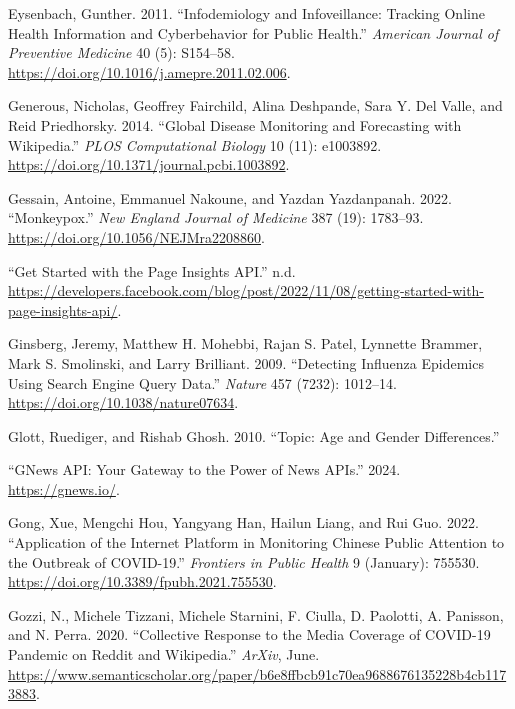 \documentclass[
  12pt,
]{article}
\newlength{\cslhangindent}
\newenvironment{CSLReferences}[2] %
 {\begin{list}{}{%
  \setlength{\itemindent}{0pt}
  \setlength{\leftmargin}{0pt}
  \setlength{\parsep}{0pt}
  \ifodd #1
   \setlength{\leftmargin}{\cslhangindent}
   \setlength{\itemindent}{-1\cslhangindent}
  \fi
  \setlength{\itemsep}{#2\baselineskip}}}
 {\end{list}}
\begin{document}
\begin{CSLReferences}{1}{0}
Eysenbach, Gunther. 2011. {``Infodemiology and Infoveillance: Tracking
Online Health Information and Cyberbehavior for Public Health.''}
\emph{American Journal of Preventive Medicine} 40 (5): S154--58.
\url{https://doi.org/10.1016/j.amepre.2011.02.006}.

Generous, Nicholas, Geoffrey Fairchild, Alina Deshpande, Sara Y. Del
Valle, and Reid Priedhorsky. 2014. {``Global Disease Monitoring and
Forecasting with Wikipedia.''} \emph{PLOS Computational Biology} 10
(11): e1003892. \url{https://doi.org/10.1371/journal.pcbi.1003892}.

Gessain, Antoine, Emmanuel Nakoune, and Yazdan Yazdanpanah. 2022.
{``Monkeypox.''} \emph{New England Journal of Medicine} 387 (19):
1783--93. \url{https://doi.org/10.1056/NEJMra2208860}.

{``Get Started with the Page Insights API.''} n.d.
\url{https://developers.facebook.com/blog/post/2022/11/08/getting-started-with-page-insights-api/}.

Ginsberg, Jeremy, Matthew H. Mohebbi, Rajan S. Patel, Lynnette Brammer,
Mark S. Smolinski, and Larry Brilliant. 2009. {``Detecting Influenza
Epidemics Using Search Engine Query Data.''} \emph{Nature} 457 (7232):
1012--14. \url{https://doi.org/10.1038/nature07634}.

Glott, Ruediger, and Rishab Ghosh. 2010. {``Topic: Age and Gender
Differences.''}

{``GNews API: Your Gateway to the Power of News APIs.''} 2024.
\url{https://gnews.io/}.

Gong, Xue, Mengchi Hou, Yangyang Han, Hailun Liang, and Rui Guo. 2022.
{``Application of the Internet Platform in Monitoring Chinese Public
Attention to the Outbreak of COVID-19.''} \emph{Frontiers in Public
Health} 9 (January): 755530.
\url{https://doi.org/10.3389/fpubh.2021.755530}.

Gozzi, N., Michele Tizzani, Michele Starnini, F. Ciulla, D. Paolotti, A.
Panisson, and N. Perra. 2020. {``Collective Response to the Media
Coverage of COVID-19 Pandemic on Reddit and Wikipedia.''} \emph{ArXiv},
June.
\url{https://www.semanticscholar.org/paper/b6e8ffbcb91c70ea9688676135228b4cb1173883}.


\end{CSLReferences}
\end{document}
